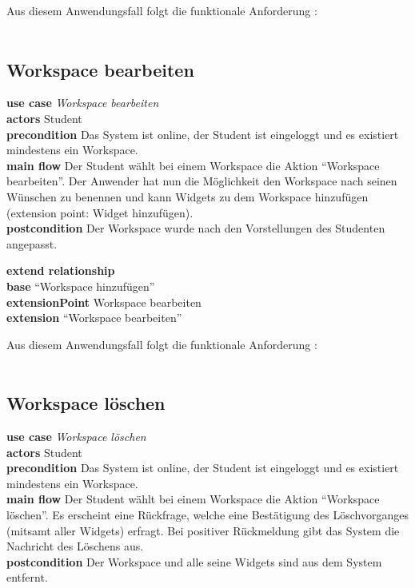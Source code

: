 Aus diesem Anwendungsfall folgt die funktionale Anforderung :\\
\requirement{\requirementWorkspaceAdd}\label{requirementWorkspaceAdd}\\
 
\subsection{Workspace bearbeiten}
\textbf{use case} \emph{Workspace bearbeiten}\\
\textbf{actors} Student\\
\textbf{precondition} Das System ist online, der Student ist eingeloggt und es existiert mindestens ein Workspace.\\
\textbf{main flow} Der Student wählt bei einem Workspace die Aktion "`Workspace bearbeiten"'. Der Anwender hat nun die Möglichkeit den Workspace nach seinen Wünschen zu benennen und kann Widgets zu dem Workspace hinzufügen (extension point: Widget hinzufügen).\\
\textbf{postcondition} Der Workspace wurde nach den Vorstellungen des Studenten angepasst.
 
\textbf{extend relationship}\\
\textbf{base} "`Workspace hinzufügen"'\\
\textbf{extensionPoint} Workspace bearbeiten\\
\textbf{extension} "`Workspace bearbeiten"'
 
Aus diesem Anwendungsfall folgt die funktionale Anforderung :\\
\requirement{\requirementWorkspaceEdit}\label{requirementWorkspaceEdit}\\
 
\subsection{Workspace löschen}
\textbf{use case} \emph{Workspace löschen}\\
\textbf{actors} Student\\
\textbf{precondition} Das System ist online, der Student ist eingeloggt und es existiert mindestens ein Workspace.\\
\textbf{main flow} Der Student wählt bei einem Workspace die Aktion "`Workspace löschen"'. Es erscheint eine Rückfrage, welche eine Bestätigung des Löschvorganges (mitsamt aller Widgets) erfragt. Bei positiver Rückmeldung gibt das System die Nachricht des Löschens aus. \\
\textbf{postcondition} Der Workspace und alle seine Widgets sind aus dem System entfernt.
 
